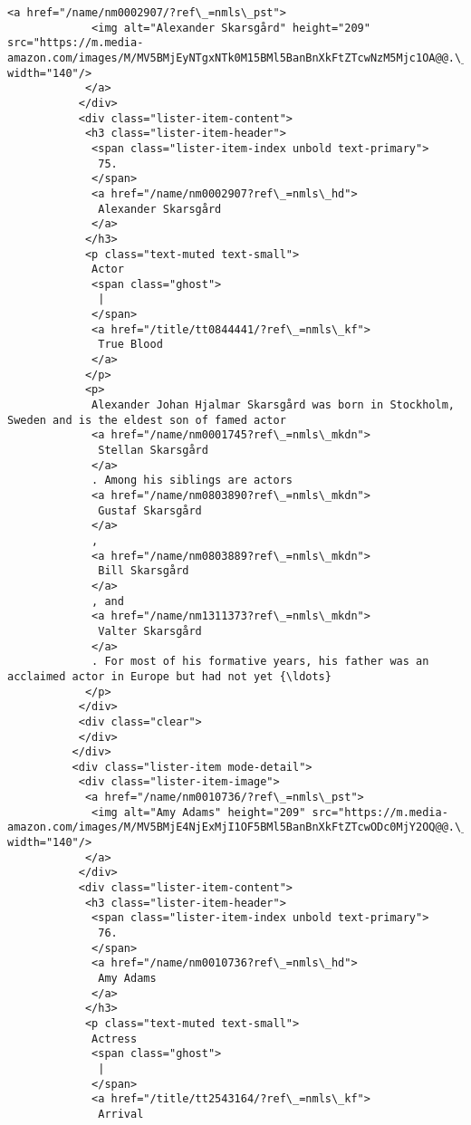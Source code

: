 \documentclass[11pt]{article}
\begin{document}
\begin{Verbatim}[commandchars=\\\{\}]
            <a href="/name/nm0002907/?ref\_=nmls\_pst">
             <img alt="Alexander Skarsgård" height="209" src="https://m.media-amazon.com/images/M/MV5BMjEyNTgxNTk0M15BMl5BanBnXkFtZTcwNzM5Mjc1OA@@.\_V1\_UY209\_CR3,0,140,209\_AL\_.jpg" width="140"/>
            </a>
           </div>
           <div class="lister-item-content">
            <h3 class="lister-item-header">
             <span class="lister-item-index unbold text-primary">
              75.
             </span>
             <a href="/name/nm0002907?ref\_=nmls\_hd">
              Alexander Skarsgård
             </a>
            </h3>
            <p class="text-muted text-small">
             Actor
             <span class="ghost">
              |
             </span>
             <a href="/title/tt0844441/?ref\_=nmls\_kf">
              True Blood
             </a>
            </p>
            <p>
             Alexander Johan Hjalmar Skarsgård was born in Stockholm, Sweden and is the eldest son of famed actor
             <a href="/name/nm0001745?ref\_=nmls\_mkdn">
              Stellan Skarsgård
             </a>
             . Among his siblings are actors
             <a href="/name/nm0803890?ref\_=nmls\_mkdn">
              Gustaf Skarsgård
             </a>
             ,
             <a href="/name/nm0803889?ref\_=nmls\_mkdn">
              Bill Skarsgård
             </a>
             , and
             <a href="/name/nm1311373?ref\_=nmls\_mkdn">
              Valter Skarsgård
             </a>
             . For most of his formative years, his father was an acclaimed actor in Europe but had not yet {\ldots}
            </p>
           </div>
           <div class="clear">
           </div>
          </div>
          <div class="lister-item mode-detail">
           <div class="lister-item-image">
            <a href="/name/nm0010736/?ref\_=nmls\_pst">
             <img alt="Amy Adams" height="209" src="https://m.media-amazon.com/images/M/MV5BMjE4NjExMjI1OF5BMl5BanBnXkFtZTcwODc0MjY2OQ@@.\_V1\_UX140\_CR0,0,140,209\_AL\_.jpg" width="140"/>
            </a>
           </div>
           <div class="lister-item-content">
            <h3 class="lister-item-header">
             <span class="lister-item-index unbold text-primary">
              76.
             </span>
             <a href="/name/nm0010736?ref\_=nmls\_hd">
              Amy Adams
             </a>
            </h3>
            <p class="text-muted text-small">
             Actress
             <span class="ghost">
              |
             </span>
             <a href="/title/tt2543164/?ref\_=nmls\_kf">
              Arrival

\end{Verbatim}
\end{document}
